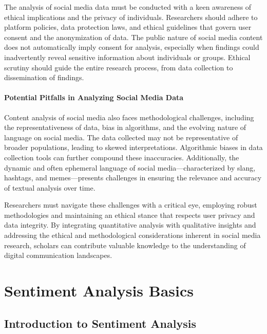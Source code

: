 \documentclass[
]{book}
\begin{document}
The analysis of social media data must be conducted with a keen awareness of ethical implications and the privacy of individuals. Researchers should adhere to platform policies, data protection laws, and ethical guidelines that govern user consent and the anonymization of data. The public nature of social media content does not automatically imply consent for analysis, especially when findings could inadvertently reveal sensitive information about individuals or groups. Ethical scrutiny should guide the entire research process, from data collection to dissemination of findings.

\hypertarget{potential-pitfalls-in-analyzing-social-media-data}{%
\subsubsection{Potential Pitfalls in Analyzing Social Media Data}\label{potential-pitfalls-in-analyzing-social-media-data}}

Content analysis of social media also faces methodological challenges, including the representativeness of data, bias in algorithms, and the evolving nature of language on social media. The data collected may not be representative of broader populations, leading to skewed interpretations. Algorithmic biases in data collection tools can further compound these inaccuracies. Additionally, the dynamic and often ephemeral language of social media---characterized by slang, hashtags, and memes---presents challenges in ensuring the relevance and accuracy of textual analysis over time.

Researchers must navigate these challenges with a critical eye, employing robust methodologies and maintaining an ethical stance that respects user privacy and data integrity. By integrating quantitative analysis with qualitative insights and addressing the ethical and methodological considerations inherent in social media research, scholars can contribute valuable knowledge to the understanding of digital communication landscapes.

\hypertarget{sentiment-analysis-basics}{%
\chapter{Sentiment Analysis Basics}\label{sentiment-analysis-basics}}

\hypertarget{introduction-to-sentiment-analysis}{%
\section{Introduction to Sentiment Analysis}\label{introduction-to-sentiment-analysis}}
\end{document}
